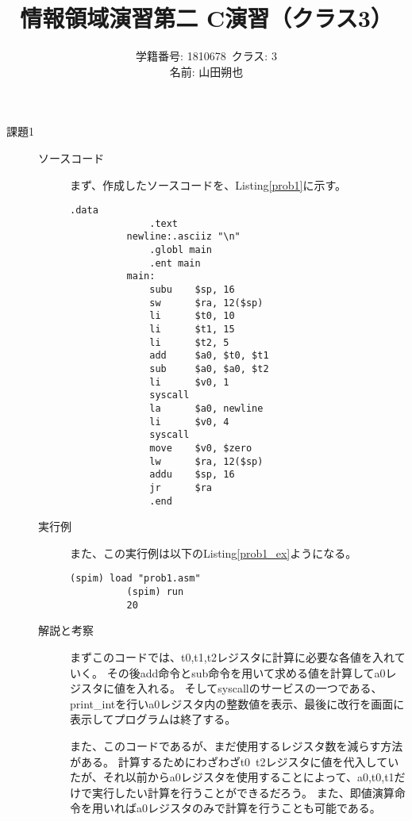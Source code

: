 \documentclass{jsarticle}
\title{情報領域演習第二 C演習（クラス3）}
\author{学籍番号: 1810678\ クラス: 3 \\
        名前: 山田朔也}
\begin{document}
  \maketitle
  \begin{description}
      \item[課題1]
      \begin{description}
          \item[ソースコード]
          まず、作成したソースコードを、Listing\ref{prob1}に示す。
          \begin{lstlisting}[caption=課題1のソースコード, label=prob1]
              .data
              .text
          newline:.asciiz "\n"
              .globl main
              .ent main
          main:
              subu    $sp, 16
              sw      $ra, 12($sp)
              li      $t0, 10
              li      $t1, 15
              li      $t2, 5
              add     $a0, $t0, $t1
              sub     $a0, $a0, $t2
              li      $v0, 1
              syscall
              la      $a0, newline
              li      $v0, 4
              syscall
              move    $v0, $zero
              lw      $ra, 12($sp)
              addu    $sp, 16
              jr      $ra
              .end
          \end{lstlisting}

          \item[実行例]
          また、この実行例は以下のListing\ref{prob1_ex}ようになる。
          \begin{lstlisting}[caption=課題1の実行例, label=prob1_ex]
          (spim) load "prob1.asm"
          (spim) run
          20
          \end{lstlisting}

          \item[解説と考察]
          まずこのコードでは、t0,t1,t2レジスタに計算に必要な各値を入れていく。
          その後add命令とsub命令を用いて求める値を計算してa0レジスタに値を入れる。
          そしてsyscallのサービスの一つである、print\_intを行いa0レジスタ内の整数値を表示、最後に改行を画面に表示してプログラムは終了する。

          また、このコードであるが、まだ使用するレジスタ数を減らす方法がある。
          計算するためにわざわざt0~t2レジスタに値を代入していたが、それ以前からa0レジスタを使用することによって、a0,t0,t1だけで実行したい計算を行うことができるだろう。
          また、即値演算命令を用いればa0レジスタのみで計算を行うことも可能である。
          \\
      \end{description}


\end{description}
\end{document}
